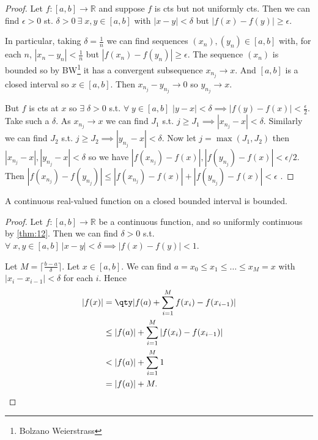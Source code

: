     \begin{proof}
        Let $f: [a, b] \to \mathbb{R}$ and suppose $f$ is cts but not uniformly cts. Then we can find $\epsilon > 0$ st. $\delta > 0 \ \exists \; x,y \in [a, b]$ with $|x-y| < \delta$ but $|f(x) - f(y)| \geq \epsilon$.

        In particular, taking $\delta = \frac{1}{n}$ we can find sequences $(x_n), (y_n) \in [a, b]$ with, for each $n$, $|x_n - y_n| < \frac{1}{n}$ but $|f(x_n) - f(y_n)| \geq \epsilon$.
        The sequence $(x_n)$ is bounded so by BW\footnote{Bolzano Weierstrass} it has a convergent subsequence $x_{n_j} \to x$.
        And $[a, b]$ is a closed interval so $x \in [a, b]$.
        Then $x_{n_j} - y_{n_j} \to 0$ so $y_{n_j} \to x$.

        But $f$ is cts at $x$ so $\exists \; \delta > 0$ s.t. $\forall \; y \in [a, b]$ $|y-x| < \delta \implies |f(y) - f(x)| < \frac{\epsilon}{2}$. 
        Take such a $\delta$.
        As $x_{n_j} \to x$ we can find $J_1$ s.t. $j \geq J_1 \implies |x_{n_j} - x| < \delta$.
        Similarly we can find $J_2$ s.t. $j \geq J_2 \implies |y_{n_j} - x| < \delta$.
        Now let $j = \max (J_1, J_2)$ then $|x_{n_j} - x|, |y_{n_j} - x| < \delta$ so we have $|f(x_{n_j}) - f(x)|, |f(y_{n_j}) - f(x)| < \epsilon / 2$.
        Then $|f(x_{n_j}) - f(y_{n_j})| \leq |f(x_{n_j}) - f(x)| + |f(y_{n_j}) - f(x)| < \epsilon$ \Lightning.
    \end{proof} 

    \begin{corollary} \label{cor:13}
        A continuous real-valued function on a closed bounded interval is bounded.
    \end{corollary} 

    \begin{proof}
        Let $f:[a, b] \to \mathbb{R}$ be a continuous function, and so uniformly continuous by \cref{thm:12}.
        Then we can find $\delta > 0$ s.t. $\forall \; x, y \in [a, b] \ |x - y| < \delta \implies |f(x) - f(y)| < 1$.

        Let $M = \lceil \frac{b - a}{\delta} \rceil$.
        Let $x \in [a, b]$.
        We can find $a = x_0 \leq x_1 \leq \dots \leq x_M = x$ with $|x_i - x_{i - 1}| < \delta$ for each $i$.
        Hence
        \begin{align*}
            |f(x)| &= \qty| f(a) + \sum_{i=1}^{M} f(x_i) - f(x_{i - 1}) |\\
            &\leq |f(a)| + \sum_{i=1}^{M} |f(x_i) - f(x_{i-1})| \\
            &< |f(a)| + \sum_{i=1}^{M} 1 \\
            &= |f(a)| + M.
        \end{align*} 
    \end{proof}
    
